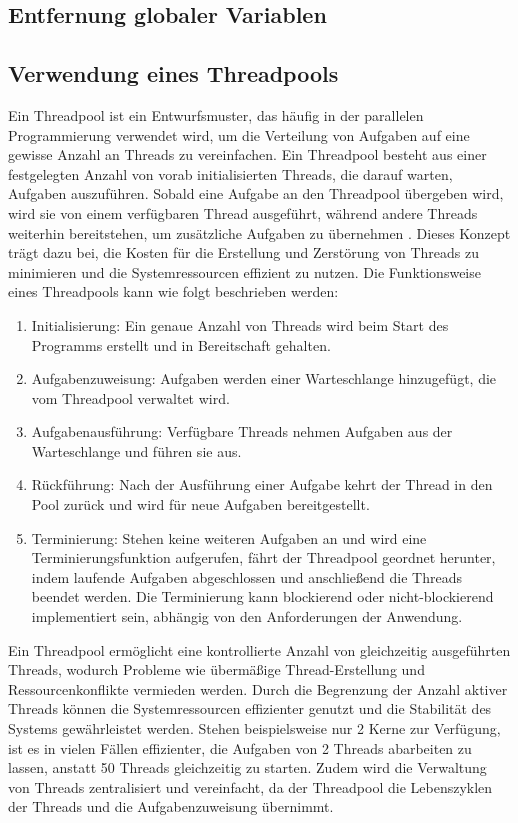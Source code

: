 \subsection{Entfernung globaler Variablen}
\label{sec:Entfernung_globaler_Variablen}

\subsection{Verwendung eines Threadpools}
\label{sec:Verwendung_Thread_Pool}

Ein Threadpool ist ein Entwurfsmuster, das häufig in der parallelen Programmierung verwendet wird, um die Verteilung von Aufgaben auf eine gewisse Anzahl an Threads zu vereinfachen. Ein Threadpool besteht aus einer festgelegten Anzahl von vorab initialisierten Threads, die darauf warten, Aufgaben auszuführen. Sobald eine Aufgabe an den Threadpool übergeben wird, wird sie von einem verfügbaren Thread ausgeführt, während andere Threads weiterhin bereitstehen, um zusätzliche Aufgaben zu übernehmen \citep{ThreadPool_Tutorial_Cpp}. Dieses Konzept trägt dazu bei, die Kosten für die Erstellung und Zerstörung von Threads zu minimieren und die Systemressourcen effizient zu nutzen. Die Funktionsweise eines Threadpools kann wie folgt beschrieben werden:
\begin{enumerate}
    \item Initialisierung: Ein genaue Anzahl von Threads wird beim Start des Programms erstellt und in Bereitschaft gehalten.
    \item Aufgabenzuweisung: Aufgaben werden einer Warteschlange hinzugefügt, die vom Threadpool verwaltet wird.
    \item Aufgabenausführung: Verfügbare Threads nehmen Aufgaben aus der Warteschlange und führen sie aus.
    \item Rückführung: Nach der Ausführung einer Aufgabe kehrt der Thread in den Pool zurück und wird für neue Aufgaben bereitgestellt.
    \item Terminierung: Stehen keine weiteren Aufgaben an und wird eine Terminierungsfunktion aufgerufen, fährt der Threadpool geordnet herunter, indem laufende Aufgaben abgeschlossen und anschließend die Threads beendet werden. Die Terminierung kann blockierend oder nicht-blockierend implementiert sein, abhängig von den Anforderungen der Anwendung.
\end{enumerate}

Ein Threadpool ermöglicht eine kontrollierte Anzahl von gleichzeitig ausgeführten Threads, wodurch Probleme wie übermäßige Thread-Erstellung und Ressourcenkonflikte vermieden werden. Durch die Begrenzung der Anzahl aktiver Threads können die Systemressourcen effizienter genutzt und die Stabilität des Systems gewährleistet werden. Stehen beispielsweise nur 2 Kerne zur Verfügung, ist es in vielen Fällen effizienter, die Aufgaben von 2 Threads abarbeiten zu lassen, anstatt 50 Threads gleichzeitig zu starten. Zudem wird die Verwaltung von Threads zentralisiert und vereinfacht, da der Threadpool die Lebenszyklen der Threads und die Aufgabenzuweisung übernimmt.

